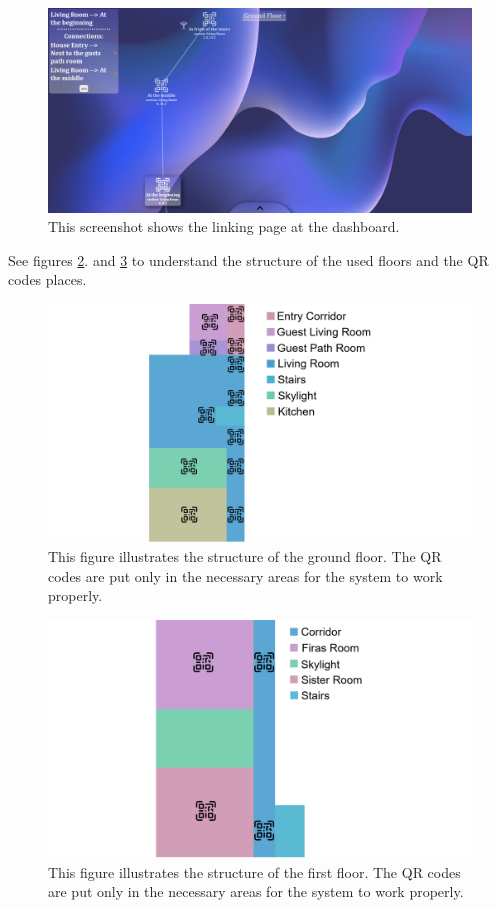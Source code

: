 \begin{figure}[h!]
	\centering
	\includegraphics[width=0.7\linewidth]{assets/Overrall System Experiment/Linking.png}
	\caption{This screenshot shows the linking page at the dashboard.}
	\label{overall_system_experiment_Linking}
\end{figure}

See figures \ref{overall_system_experiment_Ground_Floor_Structure}. and \ref{overall_system_experiment_First_Floor_Structure} to understand the structure of the used floors and the QR codes places.

\begin{figure}[h!]
	\centering
	\includegraphics[width=0.7\linewidth]{assets/Overrall System Experiment/Ground Floor Structure.png}
	\caption{This figure illustrates the structure of the ground floor. The QR codes are put only in the necessary areas for the system to work properly.}
	\label{overall_system_experiment_Ground_Floor_Structure}
\end{figure}

\begin{figure}[h!]
	\centering
	\includegraphics[width=0.7\linewidth]{assets/Overrall System Experiment/First Floor Structure.png}
	\caption{This figure illustrates the structure of the first floor. The QR codes are put only in the necessary areas for the system to work properly.}
	\label{overall_system_experiment_First_Floor_Structure}
\end{figure}

